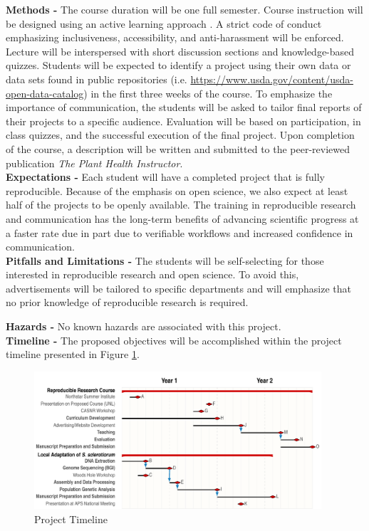 \documentclass[12pt,letterpaper]{article}
\begin{document}
\noindent \textbf{Methods -}
The course duration will be one full semester. 
Course instruction will be designed using an active learning approach \citep{freeman2014active}.
A strict code of conduct emphasizing inclusiveness, accessibility, and anti-harassment will be enforced.
Lecture will be interspersed with short discussion sections and knowledge-based quizzes.
Students will be expected to identify a project using their own data or data sets found in public repositories (i.e. \url{https://www.usda.gov/content/usda-open-data-catalog}) in the first three weeks of the course.
To emphasize the importance of communication, the students will be asked to tailor final reports of their projects to a specific audience.
Evaluation will be based on participation, in class quizzes, and the successful execution of the final project.
Upon completion of the course, a description will be written and submitted to the peer-reviewed publication \textit{The Plant Health Instructor}.\\
\noindent \textbf{Expectations -}
Each student will have a completed project that is fully reproducible. 
Because of the emphasis on open science, we also expect at least half of the projects to be openly available.
The training in reproducible research and communication has the long-term benefits of advancing scientific progress at a faster rate due in part due to verifiable workflows and increased confidence in communication.\\
\noindent \textbf{Pitfalls and Limitations -}
The students will be self-selecting for those interested in reproducible research and open science.
To avoid this, advertisements will be tailored to specific departments and will emphasize that no prior knowledge of reproducible research is required.

\noindent \textbf{Hazards -} No known hazards are associated with this project.\\
\noindent \textbf{Timeline -} The proposed objectives will be accomplished within the project timeline presented in Figure \ref{fig:timeline}.

\begin{figure}[!htbp]
  \centering
  \includegraphics[width=0.95\textwidth]{packet/timeline.pdf}
  \caption{Project Timeline}
  \label{fig:timeline}
\end{figure}
\end{document}

